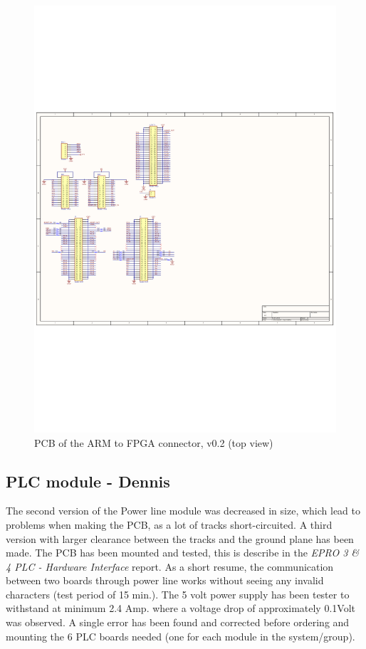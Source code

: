 \begin{figure}[H]
	\begin{centering}
		 \includegraphics[height=0.8\textwidth,page=2,angle=90]{images/dig_to_ea_v0_2}
		\caption{PCB of the ARM to FPGA connector, v0.2 (top view)}
	\end{centering}
\end{figure}


\subsection{PLC module - Dennis}
The second version of the Power line module was decreased in size, which lead to problems when making the PCB, as a lot of tracks short-circuited. A third version with larger clearance between the tracks and the ground plane has been made. The PCB has been mounted and tested, this is describe in the \textit{EPRO 3 \& 4 PLC - Hardware Interface} report. As a short resume, the communication between two boards through power line works without seeing any invalid characters (test period of 15 min.). The 5 volt power supply has been tester to withstand at minimum 2.4 Amp. where a voltage drop of approximately 0.1Volt was observed. 
A single error has been found and corrected before ordering and mounting the 6 PLC boards needed (one for each module in the system/group).

